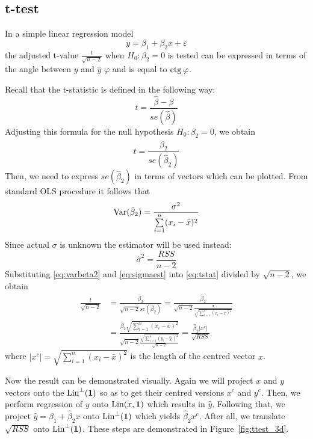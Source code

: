 \subsection{t-test}

In a simple linear regression model
\[
y = \beta_1 + \beta_2 x + \varepsilon
\]
the adjusted t-value $\frac{t}{\sqrt{n-2}}$ when $H_0: \beta_2 = 0$ is tested
can be expressed in terms of the angle between $y$ and $\hat y$ $\varphi$ and
is equal to $\operatorname{ctg} \varphi$.

Recall that the t-statistic is defined in the following way:
\[
t = \frac{\hat \beta - \beta}{se\left(\hat\beta\right)}
\]
Adjusting this formula for the null hypothesis $H_0: \beta_2 = 0$, we obtain
\begin{equation}\label{eq:tstat}
t = \frac{\hat \beta_2}{se\left(\hat\beta_2\right)}
\end{equation}
Then, we need to express $se\left(\hat\beta_2\right)$ in terms of vectors which can be
plotted. From standard OLS procedure it follows that
\begin{equation}\label{eq:varbeta2}
\operatorname{Var}(\hat \beta_2) = \frac{\sigma^2}{\sum\limits_{i=1}^n (x_i - \bar x)^2}
\end{equation}
Since actual $\sigma$ is unknown the estimator will be used instead:
\begin{equation}\label{eq:sigmaest}
\hat \sigma^2 = \frac{RSS}{n-2}
\end{equation}
Substituting \eqref{eq:varbeta2} and \eqref{eq:sigmaest} into \eqref{eq:tstat}
divided by $\sqrt{n-2}$, we obtain
\begin{align*}
\frac{t}{\sqrt{n-2}} &= \frac{\hat \beta_2}{\sqrt{n-2}se\left(\hat\beta_2\right)} = \frac{\hat \beta_2}{\sqrt{n-2}\frac{\hat \sigma}{\sqrt{\sum\limits_{i=1}^n (x_i - \bar x)^2}}} \\
&= \frac{\hat \beta_2 \sqrt{\sum\limits_{i=1}^n (x_i - \bar x)^2}}{\sqrt{n-2}\frac{\sqrt{\sum\limits_{i=1}^n (y_i - \hat y_i)^2}}{\sqrt{n-2}}} = \frac{\hat \beta_2 \vert x^c \vert}{\sqrt{RSS}}
\end{align*}
where $ \vert x^c \vert = \sqrt{\sum_{i=1}^n (x_i - \bar x)^2}$ is the length of the
centred vector $x$.

Now the result can be demonstrated visually.
Again we will project $x$ and $y$ vectors onto the $\operatorname{Lin}^{\perp}(\mathbf{1})$ so as to
get their centred versions $x^c$ and $y^c$.
Then, we perform regression of $y$ onto $\operatorname{Lin}(x, \mathbf{1})$ which results in $\hat y$.
Following that, we project $\hat y = \hat \beta_1 + \hat \beta_2 x$ onto $\operatorname{Lin}^{\perp}(\mathbf{1})$
which yields $\hat \beta_2 x^c$.
After all, we translate $\sqrt{RSS}$ onto $\operatorname{Lin}^{\perp}(\mathbf{1})$.
These steps are demonstrated in Figure~\ref{fig:ttest_3d}.

